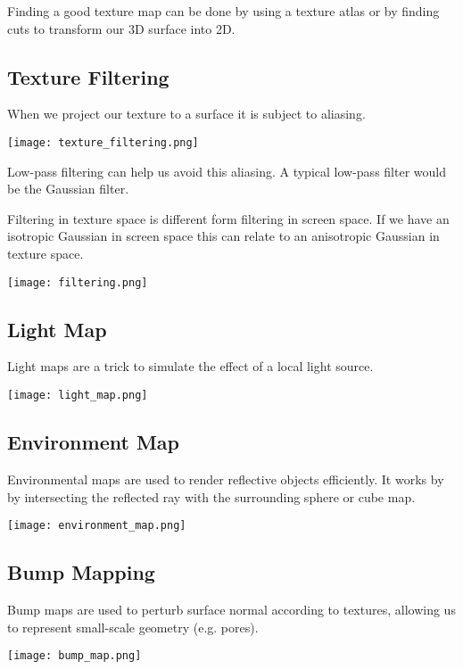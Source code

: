 Finding a good texture map can be done by using a texture atlas or by finding cuts to transform our 3D surface into 2D. 


\subsection{Texture Filtering}

When we project our texture to a surface it is subject to aliasing.
\begin{center}
	\texttt{[image: texture\_filtering.png]}
\end{center}

Low-pass filtering can help us avoid this aliasing. A typical low-pass filter would be the Gaussian filter. \medskip

Filtering in texture space is different form filtering in screen space. If we have an isotropic Gaussian in screen space this can relate to an anisotropic Gaussian in texture space.
\begin{center}
	\texttt{[image: filtering.png]}
\end{center}


\subsection{Light Map}

Light maps are a trick to simulate the effect of a local light source.
\begin{center}
	\texttt{[image: light\_map.png]}
\end{center}


\subsection{Environment Map}

Environmental maps are used to render reflective objects efficiently. It works by by intersecting the reflected ray with the surrounding sphere or cube map.
\begin{center}
	\texttt{[image: environment\_map.png]}
\end{center}


\subsection{Bump Mapping}

Bump maps are used to perturb surface normal according to textures, allowing us to represent small-scale geometry (e.g. pores).
\begin{center}
	\texttt{[image: bump\_map.png]}
\end{center}

